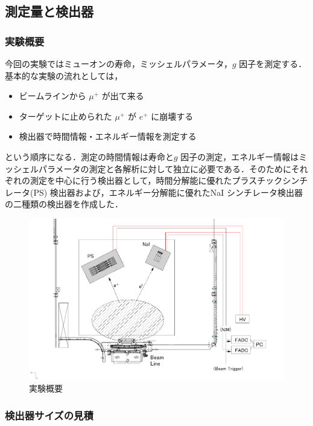 \subsection{測定量と検出器}

\subsubsection{実験概要}

今回の実験ではミューオンの寿命，ミッシェルパラメータ，$g$ 因子を測定する．基本的な実験の流れとしては，
\begin{itemize}
\item ビームラインから $\mu ^{+}$ が出て来る
\item ターゲットに止められた $\mu ^{+}$ が $e^{+}$ に崩壊する
\item 検出器で時間情報・エネルギー情報を測定する
\end{itemize}
という順序になる．測定の時間情報は寿命と$g$ 因子の測定，エネルギー情報はミッシェルパラメータの測定と各解析に対して独立に必要である．そのためにそれぞれの測定を中心に行う検出器として，時間分解能に優れたプラスチックシンチレータ(PS) 検出器および，エネルギー分解能に優れたNaI シンチレータ検出器の二種類の検出器を作成した．    
\begin{figure}[H]
\centering
\includegraphics[width=1\textwidth]{figure/hayakawa/lifetime.png}
\caption{実験概要}
\end{figure}

\subsubsection{検出器サイズの見積}

